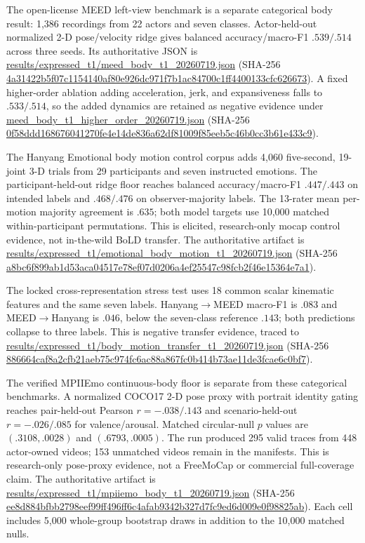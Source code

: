 \documentclass[11pt]{article}
\renewcommand{\texttt}[1]{\url{#1}}
\begin{document}
The open-license MEED left-view benchmark is a separate categorical body
result: 1,386 recordings from 22 actors and seven classes. Actor-held-out
normalized 2-D pose/velocity ridge gives balanced accuracy/macro-F1
$.539/.514$ across three seeds. Its authoritative JSON is
\texttt{results/expressed_t1/meed_body_t1_20260719.json} (SHA-256
\texttt{4a31422b5f07c1154140af80e926dc971f7b1ac84700c1ff4400133cfc626673}).
A fixed higher-order ablation adding acceleration, jerk, and expansiveness
falls to $.533/.514$, so the added dynamics are retained as negative evidence
under \texttt{meed_body_t1_higher_order_20260719.json} (SHA-256
\texttt{0f58ddd168676041270fe4e14de836a62df81009f85eeb5c46b0cc3b61e433c9}).

The Hanyang Emotional body motion control corpus adds 4,060 five-second,
19-joint 3-D trials from 29 participants and seven instructed emotions. The
participant-held-out ridge floor reaches balanced accuracy/macro-F1
$.447/.443$ on intended labels and $.468/.476$ on observer-majority labels.
The 13-rater mean per-motion majority agreement is $.635$; both model targets
use 10,000 matched within-participant permutations. This is elicited,
research-only mocap control evidence, not in-the-wild BoLD transfer. The
authoritative artifact is
\texttt{results/expressed_t1/emotional_body_motion_t1_20260719.json}
(SHA-256 \texttt{a8bc6f899ab1d53aca04517e78ef07d0206a4ef25547c98fcb2f46e15364e7a1}).

The locked cross-representation stress test uses 18 common scalar kinematic
features and the same seven labels. Hanyang$\rightarrow$MEED macro-F1 is
$.083$ and MEED$\rightarrow$Hanyang is $.046$, below the seven-class reference
$.143$; both predictions collapse to three labels. This is negative transfer
evidence, traced to
\texttt{results/expressed_t1/body_motion_transfer_t1_20260719.json}
(SHA-256 \texttt{886664caf8a2cfb21aeb75c974fc6ac88a867fc0b414b73ae11de3fcae6c0bf7}).

The verified MPIIEmo continuous-body floor is separate from these categorical
benchmarks. A normalized COCO17 2-D pose proxy with portrait identity gating
reaches pair-held-out Pearson $r=-.038/.143$ and scenario-held-out
$r=-.026/.085$ for valence/arousal. Matched circular-null $p$ values are
$(.3108,.0028)$ and $(.6793,.0005)$. The run produced 295 valid traces from
448 actor-owned videos; 153 unmatched videos remain in the manifests. This is
research-only pose-proxy evidence, not a FreeMoCap or commercial
full-coverage claim. The authoritative artifact is
\texttt{results/expressed_t1/mpiiemo_body_t1_20260719.json} (SHA-256
\texttt{ee8d884bfbb2798eef99ff496ff6c4afab9342b327d7fc9ed6d009e0f98825ab}).
Each cell includes 5,000 whole-group bootstrap draws in addition to the
10,000 matched nulls.
\end{document}
